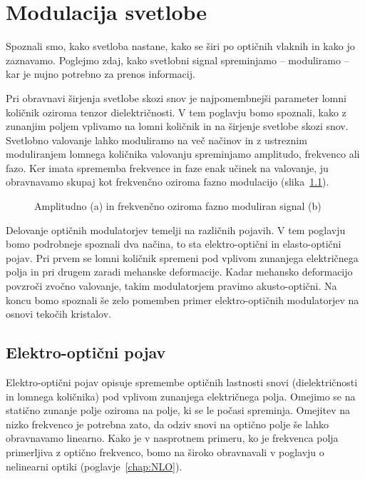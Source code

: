 
\chapter{Modulacija svetlobe}
\label{chap:modulacija}
Spoznali smo, kako svetloba nastane, kako se širi po optičnih vlaknih in kako
jo zaznavamo. Poglejmo zdaj, kako svetlobni signal spreminjamo -- moduliramo -- kar
je nujno potrebno za prenos informacij. 

Pri obravnavi širjenja svetlobe skozi snov je najpomembnejši parameter lomni količnik
oziroma tenzor dielektričnosti. V tem poglavju bomo spoznali, kako z zunanjim poljem vplivamo 
na lomni količnik in na širjenje svetlobe skozi snov. Svetlobno 
valovanje lahko moduliramo na več načinov in z ustreznim moduliranjem
lomnega količnika valovanju spreminjamo amplitudo, 
frekvenco ali fazo. Ker imata sprememba frekvence in faze enak učinek na valovanje, ju obravnavamo
skupaj kot frekvenčno oziroma fazno modulacijo
 (slika~\ref{fig:amfm}). 
\begin{figure}[ht]
\centering
\def\svgwidth{128truemm} 

\caption{Amplitudno (a) in frekvenčno oziroma fazno moduliran signal (b)
}
\label{fig:amfm}
\end{figure}

Delovanje optičnih modulatorjev temelji na različnih pojavih. V tem poglavju bomo 
podrobneje spoznali dva načina, to sta elektro-optični in elasto-optični pojav. 
Pri prvem se lomni količnik spremeni pod vplivom zunanjega električnega polja in
pri drugem zaradi mehanske deformacije. Kadar mehansko deformacijo povzroči zvočno valovanje, 
takim modulatorjem pravimo akusto-optični. Na koncu bomo spoznali še zelo pomemben 
primer elektro-optičnih modulatorjev na osnovi tekočih kristalov.

\section{Elektro-optični pojav}
\label{chap:EO}
Elektro-optični pojav opisuje spremembe optičnih lastnosti 
snovi (dielektričnosti in lomnega količnika) pod vplivom 
zunanjega električnega polja. Omejimo se na statično zunanje polje oziroma
na polje, ki se le počasi spreminja. Omejitev na nizko 
frekvenco je potrebna zato, da odziv snovi na optično polje še lahko obravnavamo linearno. 
Kako je v nasprotnem primeru, ko je frekvenca polja primerljiva z optično frekvenco, 
bomo na široko obravnavali v poglavju o nelinearni optiki (poglavje~\ref{chap:NLO}).

